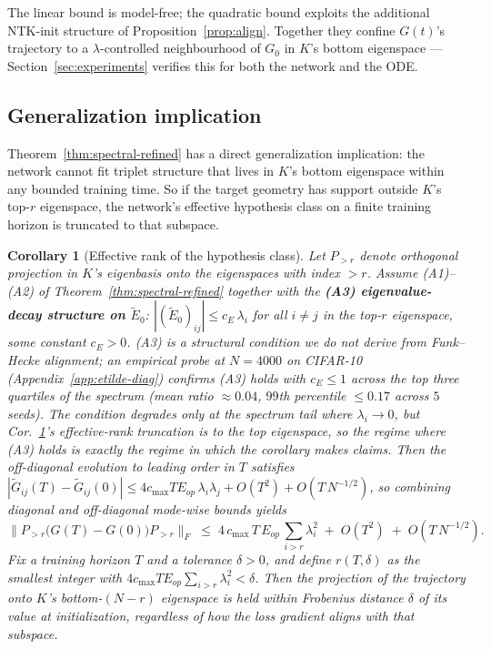 \documentclass{article}
\newtheorem{corollary}[theorem]{Corollary}
\newcommand{\E}{E}
\newcommand{\Gtilde}{\widetilde{G}}
\newcommand{\Etilde}{\widetilde{\E}}
\begin{document}
The linear bound is model-free; the quadratic bound exploits the
additional NTK-init structure of Proposition~\ref{prop:align}.
Together they confine $G(t)$'s trajectory to a $\lambda$-controlled
neighbourhood of $G_0$ in $K$'s bottom eigenspace ---
Section~\ref{sec:experiments} verifies this for both the network and
the ODE.

\subsection{Generalization implication}
\label{sec:gen}

Theorem~\ref{thm:spectral-refined} has a direct generalization
implication: the network cannot fit triplet structure that lives in
$K$'s bottom eigenspace within any bounded training time. So if the
target geometry has support outside $K$'s top-$r$ eigenspace, the
network's effective hypothesis class on a finite training horizon is
truncated to that subspace.

\begin{corollary}[Effective rank of the hypothesis class]
\label{cor:gen}
Let $P_{>r}$ denote orthogonal projection in $K$'s eigenbasis onto the
eigenspaces with index $> r$. Assume (A1)--(A2) of
Theorem~\ref{thm:spectral-refined} together with the
\textbf{(A3) eigenvalue-decay structure on $\Etilde_0$}:
$|(\Etilde_0)_{ij}| \leq c_E\,\lambda_i$ for all $i \neq j$ in the
top-$r$ eigenspace, some constant $c_E > 0$. (A3) is a structural
condition we do not derive from Funk--Hecke alignment; an
empirical probe at $N{=}4000$ on CIFAR-10
(Appendix~\ref{app:etilde-diag}) confirms (A3) holds with $c_E \leq 1$
across the top three quartiles of the spectrum (mean ratio
$\approx 0.04$, $99$th percentile $\leq 0.17$ across $5$ seeds). The
condition degrades only at the spectrum tail
where $\lambda_i \to 0$, but Cor.~\ref{cor:gen}'s effective-rank
truncation is to the top eigenspace, so the regime where (A3) holds
is exactly the regime in which the corollary makes claims.
Then the off-diagonal evolution to leading order in $T$ satisfies
$|\Gtilde_{ij}(T) - \Gtilde_{ij}(0)| \leq 4 c_{\max} T E_{op}\,\lambda_i \lambda_j + O(T^2) + O(T\,N^{-1/2})$,
so combining diagonal and off-diagonal mode-wise bounds yields
\[
\bigl\|P_{>r}\bigl(G(T) - G(0)\bigr)P_{>r}\bigr\|_F
\;\leq\; 4\,c_{\max}\,T\,E_{op}\,\sum_{i > r} \lambda_i^2
\;+\; O(T^2) \;+\; O(T\,N^{-1/2}).
\]
Fix a training horizon $T$ and a tolerance $\delta > 0$, and define
$r(T, \delta)$ as the smallest integer with
$4 c_{\max} T E_{op} \sum_{i > r} \lambda_i^2 < \delta$. Then the projection
of the trajectory onto $K$'s bottom-$(N-r)$ eigenspace is held within
Frobenius distance $\delta$ of its value at initialization, regardless of
how the loss gradient aligns with that subspace.
\end{corollary}
\end{document}
